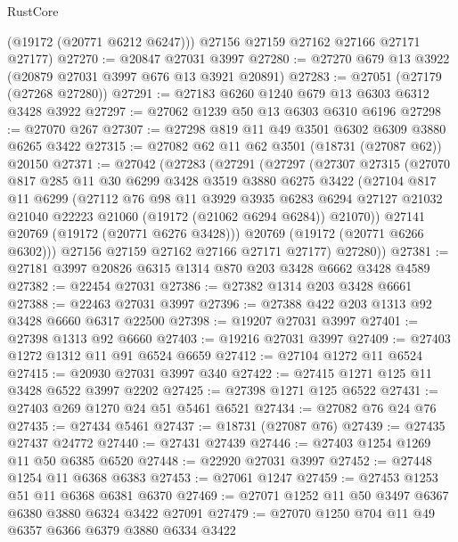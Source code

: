 \begin{lexlean}{RustCore}
\begin{coremodule}
        (@19172 (@20771 @6212 @6247)))
      @27156
      @27159
      @27162
      @27166
      @27171
      @27177)
@27270 := @20847 @27031 @3997
@27280 := @27270 @679 @13 @3922 (@20879 @27031 @3997 @676 @13 @3921 @20891)
@27283 := @27051 (@27179 (@27268 @27280))
@27291 := @27183 @6260 @1240 @679 @13 @6303 @6312 @3428 @3922
@27297 := @27062 @1239 @50 @13 @6303 @6310 @6196
@27298 := @27070 @267
@27307 := @27298 @819 @11 @49 @3501 @6302 @6309 @3880 @6265 @3422
@27315 := @27082 @62 @11 @62 @3501 (@18731 (@27087 @62)) @20150
@27371 := @27042
    (@27283
      (@27291
        (@27297
          (@27307
            @27315
            (@27070
              @817
              @285
              @11
              @30
              @6299
              @3428
              @3519
              @3880
              @6275
              @3422
              (@27104
                @817
                @11
                @6299
                (@27112
                  @76
                  @98
                  @11
                  @3929
                  @3935
                  @6283
                  @6294
                  @27127
                  @21032
                  @21040
                  @22223
                  @21060
                  (@19172 (@21062 @6294 @6284))
                  @21070))
              @27141
              @20769
              (@19172 (@20771 @6276 @3428)))
            @20769
            (@19172 (@20771 @6266 @6302)))
          @27156
          @27159
          @27162
          @27166
          @27171
          @27177)
        @27280))
@27381 := @27181 @3997 @20826 @6315 @1314 @870 @203 @3428 @6662 @3428 @4589
@27382 := @22454 @27031
@27386 := @27382 @1314 @203 @3428 @6661
@27388 := @22463 @27031 @3997
@27396 := @27388 @422 @203 @1313 @92 @3428 @6660 @6317 @22500
@27398 := @19207 @27031 @3997
@27401 := @27398 @1313 @92 @6660
@27403 := @19216 @27031 @3997
@27409 := @27403 @1272 @1312 @11 @91 @6524 @6659
@27412 := @27104 @1272 @11 @6524
@27415 := @20930 @27031 @3997 @340
@27422 := @27415 @1271 @125 @11 @3428 @6522 @3997 @2202
@27425 := @27398 @1271 @125 @6522
@27431 := @27403 @269 @1270 @24 @51 @5461 @6521
@27434 := @27082 @76 @24 @76
@27435 := @27434 @5461
@27437 := @18731 (@27087 @76)
@27439 := @27435 @27437 @24772
@27440 := @27431 @27439
@27446 := @27403 @1254 @1269 @11 @50 @6385 @6520
@27448 := @22920 @27031 @3997
@27452 := @27448 @1254 @11 @6368 @6383
@27453 := @27061 @1247
@27459 := @27453 @1253 @51 @11 @6368 @6381 @6370
@27469 := @27071 @1252 @11 @50 @3497 @6367 @6380 @3880 @6324 @3422 @27091
@27479 := @27070 @1250 @704 @11 @49 @6357 @6366 @6379 @3880 @6334 @3422

\end{coremodule}
\end{lexlean}
